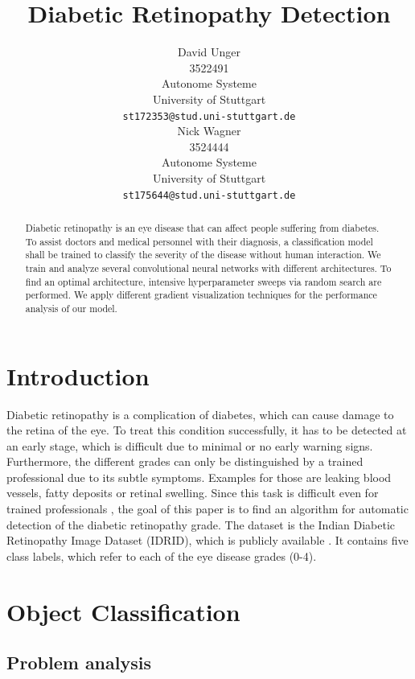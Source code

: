 \documentclass{article}
\title{Diabetic Retinopathy Detection}
\author{
  David Unger\\
  3522491 \\
  Autonome Systeme\\
  University of Stuttgart\\
  \texttt{st172353@stud.uni-stuttgart.de} \\
  \And
  Nick Wagner\\
  3524444 \\
  Autonome Systeme\\
  University of Stuttgart\\
  \texttt{st175644@stud.uni-stuttgart.de} \\
}
\begin{document}
\maketitle

\begin{abstract}
Diabetic retinopathy is an eye disease that can affect people suffering from diabetes. To assist 
doctors and medical personnel with their diagnosis, a classification model shall be trained to classify the severity 
of the disease without human interaction. 
We train and analyze several convolutional neural networks with different architectures. To find an optimal architecture, 
intensive hyperparameter sweeps via random search are performed. We apply different gradient visualization techniques for the performance
analysis of our model.
\end{abstract}

\section{Introduction}
Diabetic retinopathy is a complication of diabetes, which can cause damage to the retina of the eye.
To treat this condition successfully, it has to be detected at an early stage, which is difficult due to minimal or no early warning signs. 
Furthermore, the different grades can only be distinguished by a trained professional due to its subtle symptoms.
Examples for those are leaking blood vessels, fatty deposits or retinal swelling.
Since this task is difficult even for trained professionals \cite{DBRscience}, the goal of this paper is to find an algorithm for automatic
detection of the diabetic retinopathy grade. The dataset is the Indian Diabetic Retinopathy Image Dataset (IDRID), which 
is publicly available \cite{IDRiDdataset}. It contains five class labels, which refer to each of the eye disease grades (0-4).

\section{Object Classification}
\subsection{Problem analysis}
\end{document}
